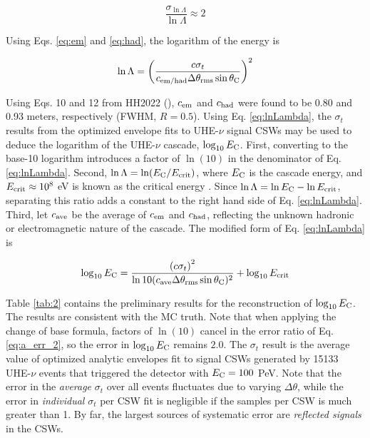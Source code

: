 \documentclass[amsmath,amssymb,aps,prd,10pt,twocolumn,showkeys]{revtex4}
\begin{document}
\begin{itemize}
\begin{equation}
\frac{\sigma_{\ln\Lambda}}{\ln\Lambda} \approx 2 \label{eq:a_err_2}
\end{equation}

Using Eqs. \ref{eq:em} and \ref{eq:had}, the logarithm of the energy is

\begin{equation}
\ln\Lambda = \left( \frac{c\sigma_t}{c_{\rm em/had} \Delta\theta_{\rm rms}\sin\theta_{\rm C}} \right)^2 \label{eq:lnLambda}
\end{equation}

Using Eqs. 10 and 12 from HH2022 (\cite{PhysRevD.105.123019}), $c_{\rm em}$ and $c_{\rm had}$ were found to be 0.80 and 0.93 meters, respectively (FWHM, $R=0.5$).  Using Eq. \ref{eq:lnLambda}, the $\sigma_t$ results from the optimized envelope fits to UHE-$\nu$ signal CSWs may be used to deduce the logarithm of the UHE-$\nu$ cascade, $\log_{10} E_{\rm C}$.  First, converting to the base-10 logarithm introduces a factor of $\ln(10)$ in the denominator of Eq. \ref{eq:lnLambda}.  Second, $\ln\Lambda = \ln(E_{\rm C}/E_{\rm crit})$, where $E_{\rm C}$ is the cascade energy, and $E_{\rm crit}\approx 10^8$ eV is known as the critical energy \cite{PhysRevD.105.123019}.  Since $\ln\Lambda = \ln E_{\rm C} - \ln E_{\rm crit}$, separating this ratio adds a constant to the right hand side of Eq. \ref{eq:lnLambda}.  Third, let $c_{\rm ave}$ be the average of $c_{\rm em}$ and $c_{\rm had}$, reflecting the unknown hadronic or electromagnetic nature of the cascade.  The modified form of Eq. \ref{eq:lnLambda} is

\begin{equation}
\log_{10} E_{\rm C} = \frac{\left( c\sigma_t \right)^2}{\ln 10(c_{\rm ave} \Delta\theta_{\rm rms}\sin\theta_{\rm C})^2} + \log_{10} E_{\rm crit} \label{eq:lnLambda_2}
\end{equation}

Table \ref{tab:2} contains the preliminary results for the reconstruction of $\log_{10}E_{\rm C}$.  The results are consistent with the MC truth.  Note that when applying the change of base formula, factors of $\ln(10)$ cancel in the error ratio of Eq. \ref{eq:a_err_2}, so the error in $\log_{10} E_{\rm C}$ remains $2.0$.  The $\sigma_t$ result is the average value of optimized analytic envelopes fit to signal CSWs generated by 15133 UHE-$\nu$ events that triggered the detector with $E_{\rm C} = 100$ PeV.  Note that the error in the \textit{average} $\sigma_t$ over all events fluctuates due to varying $\Delta\theta$, while the error in \textit{individual} $\sigma_t$ per CSW fit is negligible if the samples per CSW is much greater than 1.  By far, the largest sources of systematic error are \textit{reflected signals} in the CSWs.


\end{itemize}
\end{document}
